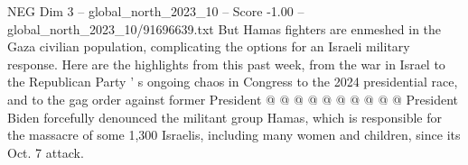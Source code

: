 \begin{textsample}{NEG Dim 3 – global\_north\_2023\_10 – Score -1.00 – global\_north\_2023\_10/91696639.txt}
But Hamas fighters are enmeshed in the Gaza civilian population, complicating the options for an Israeli military response.
Here are the highlights from this past week, from the war in Israel to the Republican Party ' s ongoing chaos in Congress to the 2024 presidential race, and to the gag order against former President @ @ @ @ @ @ @ @ @ @ President Biden forcefully denounced the militant group Hamas, which is responsible for the massacre of some 1,300 Israelis, including many women and children, since its Oct. 7 attack.

\end{textsample}
